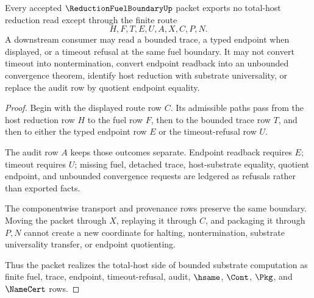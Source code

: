 \begin{theorem}
\label{thm:reduction-fuel-boundary-total-host-nonescape}
Every accepted $\ReductionFuelBoundaryUp$ packet exports no total-host reduction read except through the finite route
$$
H,F,T,E,U,A,X,C,P,N .
$$
A downstream consumer may read a bounded trace, a typed endpoint when displayed, or a timeout refusal at the same fuel boundary. It may not convert timeout into nontermination, convert endpoint readback into an unbounded convergence theorem, identify host reduction with substrate universality, or replace the audit row by quotient endpoint equality.
\end{theorem}
\begin{proof}
Begin with the displayed route row $C$. Its admissible paths pass from the host reduction row $H$ to the fuel row $F$, then to the bounded trace row $T$, and then to either the typed endpoint row $E$ or the timeout-refusal row $U$.

The audit row $A$ keeps those outcomes separate. Endpoint readback requires $E$; timeout requires $U$; missing fuel, detached trace, host-substrate equality, quotient endpoint, and unbounded convergence requests are ledgered as refusals rather than exported facts.

The componentwise transport and provenance rows preserve the same boundary. Moving the packet through $X$, replaying it through $C$, and packaging it through $P,N$ cannot create a new coordinate for halting, nontermination, substrate universality transfer, or endpoint quotienting.

Thus the packet realizes the total-host side of bounded substrate computation as finite fuel, trace, endpoint, timeout-refusal, audit, $\hsame$, $\Cont$, $\Pkg$, and $\NameCert$ rows.
\end{proof}

